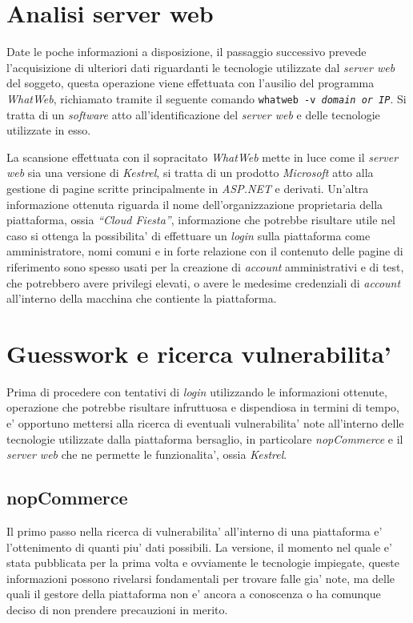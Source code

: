 \documentclass[a4paper]{report}
\newcommand{\quotes}[1]{``#1''}
\begin{document}
		\section{Analisi server web}\label{analisi_server_web}
			Date le poche informazioni a disposizione, il passaggio successivo prevede l'acquisizione di ulteriori dati
			riguardanti le tecnologie utilizzate dal \emph{server web} del soggeto, questa operazione viene effettuata
			con l'ausilio del programma \emph{WhatWeb}\label{whatweb}, richiamato tramite il seguente comando
			\texttt{whatweb -v \emph{domain or IP}}. Si tratta di un \emph{software} atto all'identificazione del
			\emph{server web} e delle tecnologie utilizzate in esso.

			La scansione effettuata con il sopracitato \emph{WhatWeb} mette in luce come il \emph{server web} sia una
			versione di \emph{Kestrel}, si tratta di un prodotto \emph{Microsoft} atto alla gestione di pagine scritte
			principalmente in \emph{ASP.NET} e derivati. Un'altra informazione ottenuta riguarda il nome
			dell'organizzazione proprietaria della piattaforma, ossia \emph{\quotes{Cloud Fiesta}}, informazione che
			potrebbe risultare utile nel caso si ottenga la possibilita' di effettuare un \emph{login} sulla piattaforma
			come amministratore, nomi comuni e in forte relazione con il contenuto delle pagine di riferimento sono
			spesso usati per la creazione di \emph{account} amministrativi e di test, che potrebbero avere privilegi
			elevati, o avere le medesime credenziali di \emph{account} all'interno della macchina che contiente la
			piattaforma.
		\section{Guesswork e ricerca vulnerabilita'}\label{guesswork_e_ricerca_vulnerabilita}
			Prima di procedere con tentativi di \emph{login} utilizzando le informazioni ottenute, operazione che
			potrebbe risultare infruttuosa e dispendiosa in termini di tempo, e' opportuno mettersi alla ricerca di
			eventuali vulnerabilita' note all'interno delle tecnologie utilizzate dalla piattaforma bersaglio, in
			particolare \emph{nopCommerce} e il \emph{server web} che ne permette le funzionalita', ossia
			\emph{Kestrel}. 
			\subsection{nopCommerce}\label{nopcomerce_2}
				Il primo passo nella ricerca di vulnerabilita' all'interno di una piattaforma e' l'ottenimento di quanti
				piu' dati possibili. La versione, il momento nel quale e' stata pubblicata per la prima volta e
				ovviamente le tecnologie impiegate, queste informazioni possono rivelarsi fondamentali per trovare falle
				gia' note, ma delle quali il gestore della piattaforma non e' ancora a conoscenza o ha comunque deciso
				di non prendere precauzioni in merito.
\end{document}
